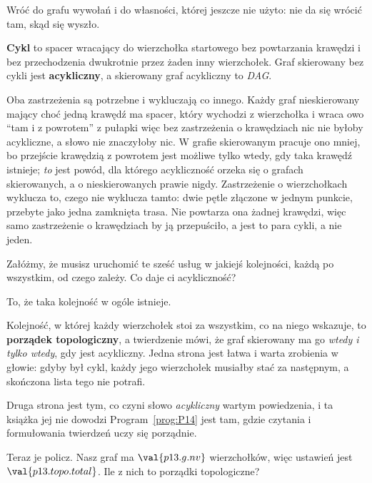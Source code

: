 \begin{fr}
Wróć do grafu wywołań i do własności, której jeszcze nie użyto: nie da się
wrócić tam, skąd się wyszło.

\textbf{Cykl} to spacer wracający do wierzchołka startowego bez powtarzania
krawędzi i bez przechodzenia dwukrotnie przez żaden inny wierzchołek. Graf
skierowany bez cykli jest \textbf{acykliczny}, a skierowany graf acykliczny to
\emph{DAG}.

Oba zastrzeżenia są potrzebne i wykluczają co innego. Każdy graf
nieskierowany mający choć jedną krawędź ma spacer, który wychodzi z
wierzchołka i wraca \dash{} owo \enquote{tam i z powrotem} z pułapki \dash{}
więc bez zastrzeżenia o krawędziach nic nie byłoby acykliczne, a słowo nie
znaczyłoby nic. W grafie skierowanym pracuje ono mniej, bo przejście krawędzią
z powrotem jest możliwe tylko wtedy, gdy taka krawędź istnieje; \emph{to} jest
powód, dla którego acykliczność orzeka się o grafach skierowanych, a o
nieskierowanych prawie nigdy. Zastrzeżenie o wierzchołkach wyklucza to, czego
nie wyklucza tamto: dwie pętle złączone w jednym punkcie, przebyte jako jedna
zamknięta trasa. Nie powtarza ona żadnej krawędzi, więc samo zastrzeżenie o
krawędziach by ją przepuściło, a jest to para cykli, a nie jeden.

Załóżmy, że musisz uruchomić te sześć usług w jakiejś kolejności, każdą po
wszystkim, od czego zależy. Co daje ci acykliczność?
\dotline
\nextframe
\end{fr}

\begin{fr}
\begin{ansblock}
To, że taka kolejność w ogóle istnieje.
\end{ansblock}

Kolejność, w której każdy wierzchołek stoi za wszystkim, co na niego wskazuje,
to \textbf{porządek topologiczny}, a twierdzenie mówi, że graf skierowany ma go
\emph{wtedy i tylko wtedy}, gdy jest acykliczny. Jedna strona jest łatwa i
warta zrobienia w głowie: gdyby był cykl, każdy jego wierzchołek musiałby stać
za następnym, a skończona lista tego nie potrafi.

Druga strona jest tym, co czyni słowo \emph{acykliczny} wartym powiedzenia, i
ta książka jej nie dowodzi \dash{} Program~\ref{prog:P14} jest tam, gdzie
czytania i formułowania twierdzeń uczy się porządnie.

Teraz je policz. Nasz graf ma $\val{p13.g.nv}$ wierzchołków, więc ustawień
jest $\val{p13.topo.total}$. Ile z nich to porządki topologiczne?
\nextframe
\end{fr}

